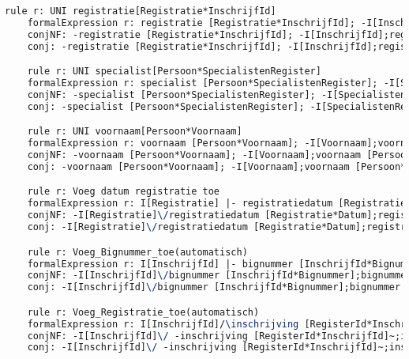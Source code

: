 \begin{lstlisting}[language=TeX]
    rule r: UNI registratie[Registratie*InschrijfId]
    formalExpression r: registratie [Registratie*InschrijfId]; -I[InschrijfId];registratie [Registratie*InschrijfId]~ |- -I[Registratie]
    conjNF: -registratie [Registratie*InschrijfId]; -I[InschrijfId];registratie [Registratie*InschrijfId]~\/ -I[Registratie]
    conj: -registratie [Registratie*InschrijfId]; -I[InschrijfId];registratie [Registratie*InschrijfId]~\/ -I[Registratie]

    rule r: UNI specialist[Persoon*SpecialistenRegister]
    formalExpression r: specialist [Persoon*SpecialistenRegister]; -I[SpecialistenRegister];specialist [Persoon*SpecialistenRegister]~ |- -I[Persoon]
    conjNF: -specialist [Persoon*SpecialistenRegister]; -I[SpecialistenRegister];specialist [Persoon*SpecialistenRegister]~\/ -I[Persoon]
    conj: -specialist [Persoon*SpecialistenRegister]; -I[SpecialistenRegister];specialist [Persoon*SpecialistenRegister]~\/ -I[Persoon]

    rule r: UNI voornaam[Persoon*Voornaam]
    formalExpression r: voornaam [Persoon*Voornaam]; -I[Voornaam];voornaam [Persoon*Voornaam]~ |- -I[Persoon]
    conjNF: -voornaam [Persoon*Voornaam]; -I[Voornaam];voornaam [Persoon*Voornaam]~\/ -I[Persoon]
    conj: -voornaam [Persoon*Voornaam]; -I[Voornaam];voornaam [Persoon*Voornaam]~\/ -I[Persoon]

    rule r: Voeg datum registratie toe
    formalExpression r: I[Registratie] |- registratiedatum [Registratie*Datum];registratiedatum [Registratie*Datum]~
    conjNF: -I[Registratie]\/registratiedatum [Registratie*Datum];registratiedatum [Registratie*Datum]~
    conj: -I[Registratie]\/registratiedatum [Registratie*Datum];registratiedatum [Registratie*Datum]~

    rule r: Voeg_Bignummer_toe(automatisch)
    formalExpression r: I[InschrijfId] |- bignummer [InschrijfId*Bignummer];bignummer [InschrijfId*Bignummer]~
    conjNF: -I[InschrijfId]\/bignummer [InschrijfId*Bignummer];bignummer [InschrijfId*Bignummer]~
    conj: -I[InschrijfId]\/bignummer [InschrijfId*Bignummer];bignummer [InschrijfId*Bignummer]~

    rule r: Voeg_Registratie_toe(automatisch)
    formalExpression r: I[InschrijfId]/\inschrijving [RegisterId*InschrijfId]~;inschrijving [RegisterId*InschrijfId] |- registratie [Registratie*InschrijfId]~;registratie [Registratie*InschrijfId]
    conjNF: -I[InschrijfId]\/ -inschrijving [RegisterId*InschrijfId]~;inschrijving [RegisterId*InschrijfId]\/registratie [Registratie*InschrijfId]~;registratie [Registratie*InschrijfId]
    conj: -I[InschrijfId]\/ -inschrijving [RegisterId*InschrijfId]~;inschrijving [RegisterId*InschrijfId]\/registratie [Registratie*InschrijfId]~;registratie [Registratie*InschrijfId]


\end{lstlisting}
